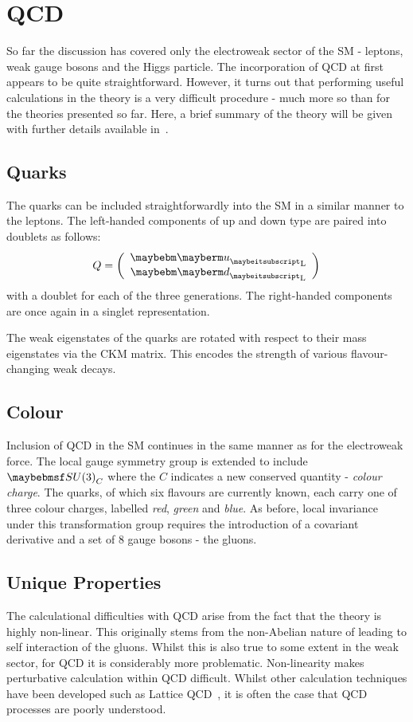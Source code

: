 \section{\acl{QCD}}
So far the discussion has covered only the electroweak sector of the \ac{SM} -
leptons, weak gauge bosons and the Higgs particle. The incorporation of
\acl{QCD} at first appears to be quite straightforward. However, it turns out
that performing useful calculations in the theory is a very difficult procedure
- much more so than for the theories presented so far. Here, a brief summary of
the theory will be given with further details available in~\cite{pink_book}.

\subsection{Quarks}
The quarks can be included straightforwardly into the \ac{SM} in a similar
manner to the leptons. The left-handed components of up and down type are paired
into doublets as follows:
\begin{equation}
Q=\left(\begin{array}{c}\Pup_{\textrm{L}} \\ \Pdown_{\textrm{L}}\end{array}\right)
\end{equation}
with a doublet for each of the three generations. The right-handed components
are once again in a singlet representation.

The weak eigenstates of the quarks are rotated with respect to their mass
eigenstates via the \ac{CKM} matrix. This encodes the strength of various
flavour-changing weak decays.

\subsection{Colour}
Inclusion of \ac{QCD} in the \ac{SM} continues in the same manner as for the
electroweak force. The local gauge symmetry group is extended to include
$\SUthree_{C}$ where the $C$ indicates a new conserved quantity - \emph{colour
  charge}. The quarks, of which six flavours are currently known, each carry one
of three colour charges, labelled \emph{red}, \emph{green} and \emph{blue}. As
before, local invariance under this transformation group requires the
introduction of a covariant derivative and a set of 8 gauge bosons - the gluons.

\subsection{Unique Properties}
The calculational difficulties with \ac{QCD} arise from the fact that the theory
is highly non-linear. This originally stems from the non-Abelian nature of
\SUthree leading to self interaction of the gluons. Whilst this is also true to
some extent in the weak sector, for \ac{QCD} it is considerably more
problematic. Non-linearity makes perturbative calculation within \ac{QCD}
difficult. Whilst other calculation techniques have been developed such as
Lattice \ac{QCD}~\cite{lattice_qcd}, it is often the case that \ac{QCD}
processes are poorly understood.

